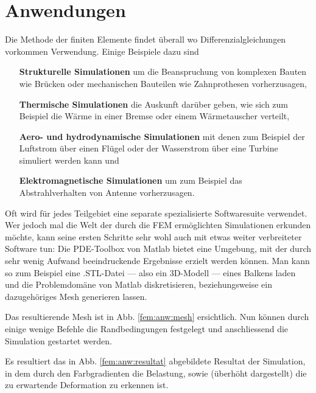 %
%
%
%
\section{Anwendungen\label{fem:section:anwendungen}}

Die Methode der finiten Elemente findet überall wo Differenzialgleichungen vorkommen Verwendung.
Einige Beispiele dazu sind
\begin{itemize}
    \item [\textbf{Strukturelle Simulationen}] um die Beanspruchung von komplexen Bauten wie Brücken oder mechanischen Bauteilen wie Zahnprothesen vorherzusagen,
    \item [\textbf{Thermische Simulationen}] die Auskunft darüber geben, wie sich zum Beispiel die Wärme in einer Bremse oder einem Wärmetauscher verteilt,
    \item [\textbf{Aero- und hydrodynamische Simulationen}] mit denen zum Beispiel der Luftstrom über einen Flügel oder der Wasserstrom über eine Turbine simuliert werden kann und
    \item [\textbf{Elektromagnetische Simulationen}] um zum Beispiel das Abstrahlverhalten von Antenne vorherzusagen.
\end{itemize}

Oft wird für jedes Teilgebiet eine separate spezialisierte Softwaresuite verwendet.
Wer jedoch mal die Welt der durch die FEM ermöglichten Simulationen erkunden möchte, kann seine ersten Schritte sehr wohl auch mit etwas weiter verbreiteter Software tun: 
Die PDE-Toolbox von Matlab bietet eine Umgebung, mit der durch sehr wenig Aufwand beeindruckende Ergebnisse erzielt werden können.
Man kann so zum Beispiel eine .STL-Datei --- also ein 3D-Modell --- eines Balkens laden und die Problemdomäne von Matlab diskretisieren, beziehungsweise ein dazugehöriges Mesh generieren lassen. 

Das resultierende Mesh ist in Abb. \ref{fem:anw:mesh} ersichtlich.
Nun können durch einige wenige Befehle die Randbedingungen festgelegt und anschliessend die Simulation gestartet werden.

Es resultiert das in Abb. \ref{fem:anw:resultat} abgebildete Resultat der Simulation, in dem durch den Farbgradienten die Belastung, sowie (überhöht dargestellt) die zu erwartende Deformation zu erkennen ist.